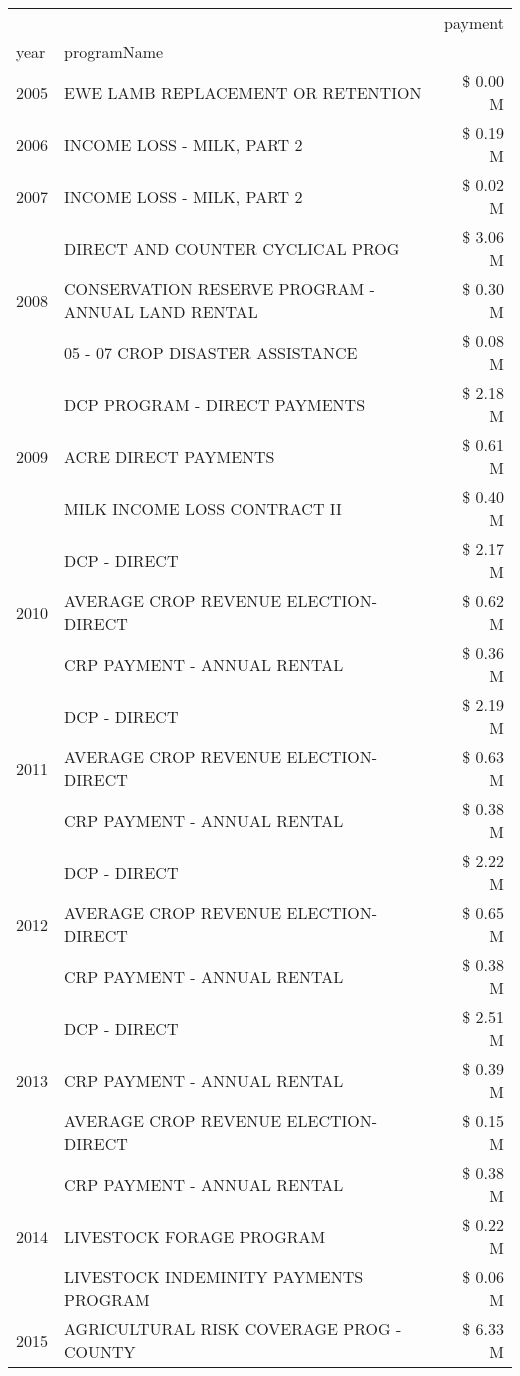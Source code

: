 \begin{tabular}{llr}
\toprule
 &  & payment \\
year & programName &  \\
\midrule
2005 & EWE LAMB REPLACEMENT OR RETENTION & \$ 0.00 M \\
\cline{1-3}
2006 & INCOME LOSS - MILK, PART 2 & \$ 0.19 M \\
\cline{1-3}
2007 & INCOME LOSS - MILK, PART 2 & \$ 0.02 M \\
\cline{1-3}
\multirow[t]{3}{*}{2008} & DIRECT AND COUNTER CYCLICAL PROG & \$ 3.06 M \\
 & CONSERVATION RESERVE PROGRAM - ANNUAL LAND RENTAL & \$ 0.30 M \\
 & 05 - 07 CROP DISASTER ASSISTANCE & \$ 0.08 M \\
\cline{1-3}
\multirow[t]{3}{*}{2009} & DCP PROGRAM - DIRECT PAYMENTS & \$ 2.18 M \\
 & ACRE DIRECT PAYMENTS & \$ 0.61 M \\
 & MILK INCOME LOSS CONTRACT II & \$ 0.40 M \\
\cline{1-3}
\multirow[t]{3}{*}{2010} & DCP - DIRECT & \$ 2.17 M \\
 & AVERAGE CROP REVENUE ELECTION-DIRECT & \$ 0.62 M \\
 & CRP PAYMENT - ANNUAL RENTAL & \$ 0.36 M \\
\cline{1-3}
\multirow[t]{3}{*}{2011} & DCP - DIRECT & \$ 2.19 M \\
 & AVERAGE CROP REVENUE ELECTION-DIRECT & \$ 0.63 M \\
 & CRP PAYMENT - ANNUAL RENTAL & \$ 0.38 M \\
\cline{1-3}
\multirow[t]{3}{*}{2012} & DCP - DIRECT & \$ 2.22 M \\
 & AVERAGE CROP REVENUE ELECTION-DIRECT & \$ 0.65 M \\
 & CRP PAYMENT - ANNUAL RENTAL & \$ 0.38 M \\
\cline{1-3}
\multirow[t]{3}{*}{2013} & DCP - DIRECT & \$ 2.51 M \\
 & CRP PAYMENT - ANNUAL RENTAL & \$ 0.39 M \\
 & AVERAGE CROP REVENUE ELECTION-DIRECT & \$ 0.15 M \\
\cline{1-3}
\multirow[t]{3}{*}{2014} & CRP PAYMENT - ANNUAL RENTAL & \$ 0.38 M \\
 & LIVESTOCK FORAGE PROGRAM & \$ 0.22 M \\
 & LIVESTOCK INDEMINITY PAYMENTS PROGRAM & \$ 0.06 M \\
\cline{1-3}
\multirow[t]{3}{*}{2015} & AGRICULTURAL RISK COVERAGE PROG - COUNTY & \$ 6.33 M \\

\end{tabular}
